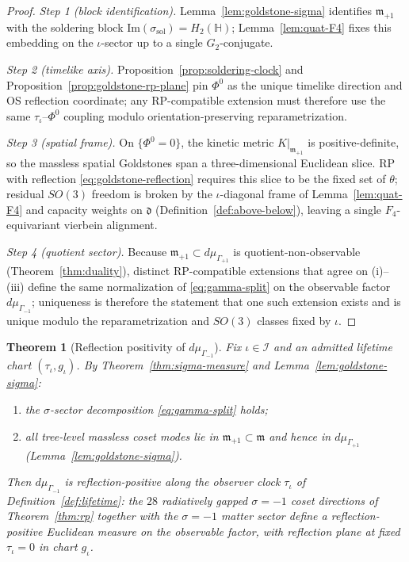 \documentclass[11pt]{article}
\theoremstyle{plain}
\newtheorem{theorem}{Theorem}[section]
\theoremstyle{definition}
\theoremstyle{remark}
\numberwithin{equation}{section}
\newcommand{\Quat}{\mathbb{H}}
\newcommand{\orderparam}{\Phi}
\begin{document}
\begin{proof}
\emph{Step 1 (block identification).} Lemma~\ref{lem:goldstone-sigma}
identifies $\mathfrak{m}_{+1}$ with the soldering block
$\mathrm{Im}(\sigma_{\mathrm{sol}})=H_2(\Quat)$; Lemma~\ref{lem:quat-F4}
fixes this embedding on the $\iota$-sector up to a single $G_2$-conjugate.

\emph{Step 2 (timelike axis).} Proposition~\ref{prop:soldering-clock} and
Proposition~\ref{prop:goldstone-rp-plane} pin $\orderparam^0$ as the unique
timelike direction and OS reflection coordinate; any RP-compatible extension
must therefore use the same $\tau_\iota$--$\orderparam^0$ coupling modulo
orientation-preserving reparametrization.

\emph{Step 3 (spatial frame).} On $\{\orderparam^0=0\}$, the kinetic metric
$K|_{\mathfrak{m}_{+1}}$ is positive-definite, so the massless spatial
Goldstones span a three-dimensional Euclidean slice. RP with reflection
\eqref{eq:goldstone-reflection} requires this slice to be the fixed set of
$\theta$; residual $SO(3)$ freedom is broken by the $\iota$-diagonal frame
of Lemma~\ref{lem:quat-F4} and capacity weights on $\mathfrak{d}$
(Definition~\ref{def:above-below}), leaving a single $F_4$-equivariant
vierbein alignment.

\emph{Step 4 (quotient sector).} Because $\mathfrak{m}_{+1}\subset
d\mu_{\Gamma_{+1}}$ is quotient-non-observable
(Theorem~\ref{thm:duality}), distinct RP-compatible extensions that agree on
(i)--(iii) define the same normalization of \eqref{eq:gamma-split} on the
observable factor $d\mu_{\Gamma_{-1}}$; uniqueness is therefore the statement
that one such extension exists and is unique modulo the reparametrization and
$SO(3)$ classes fixed by $\iota$.
\end{proof}

\begin{theorem}[Reflection positivity of $d\mu_{\Gamma_{-1}}$]
\label{thm:rp-gamma-neg}
Fix $\iota\in\mathcal{I}$ and an admitted lifetime chart
$(\tau_\iota,g_\iota)$. By Theorem~\ref{thm:sigma-measure} and
Lemma~\ref{lem:goldstone-sigma}:
\begin{enumerate}[label=(\roman*),leftmargin=*]
  \item the $\sigma$-sector decomposition \eqref{eq:gamma-split} holds;
  \item all tree-level massless coset modes lie in
    $\mathfrak{m}_{+1}\subset\mathfrak{m}$ and hence in $d\mu_{\Gamma_{+1}}$
    (Lemma~\ref{lem:goldstone-sigma}).
\end{enumerate}
Then $d\mu_{\Gamma_{-1}}$ is reflection-positive along the observer clock
$\tau_\iota$ of Definition~\ref{def:lifetime}: the $28$ radiatively gapped
$\sigma=-1$ coset directions of Theorem~\ref{thm:rp} together with the
$\sigma=-1$ matter sector define a reflection-positive Euclidean measure on
the observable factor, with reflection plane at fixed $\tau_\iota=0$ in chart
$g_\iota$.
\end{theorem}
\end{document}
